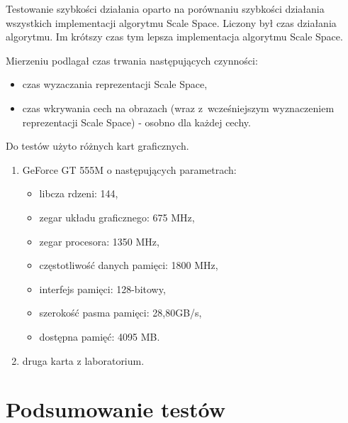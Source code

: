 Testowanie szybkości działania oparto na porównaniu szybkości działania wszystkich implementacji algorytmu Scale Space. Liczony był czas działania algorytmu. Im krótszy czas tym lepsza implementacja algorytmu Scale Space.

Mierzeniu podlagał czas trwania następujących czynności:
\begin{itemize}
\item czas wyzaczania reprezentacji Scale Space,
\item czas wkrywania cech na obrazach (wraz z~wcześniejszym wyznaczeniem reprezentacji Scale Space) - osobno dla każdej cechy.
\end{itemize}

Do testów użyto różnych kart graficznych.
\begin{enumerate}
\item GeForce GT 555M \cite{GT555M} o następujących parametrach:
\begin{itemize}
\item libcza rdzeni: 144,
\item zegar układu graficznego: 675 MHz,
\item zegar procesora: 1350 MHz,
\item częstotliwość danych pamięci: 1800 MHz,
\item interfejs pamięci: 128-bitowy,
\item szerokość pasma pamięci: 28,80GB/s,
\item dostępna pamięć: 4095 MB.
\end{itemize}
\item druga karta z laboratorium.
\end{enumerate}


\section{Podsumowanie testów}
\label{sec:testPodsumowanie}

